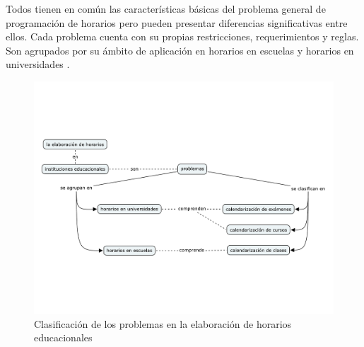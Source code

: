 \documentclass[draft,12pt,headsepline,footsepline,paper=letter]{scrreprt}
\begin{document}
Todos tienen en común las características básicas del problema general de programación de horarios pero pueden presentar diferencias significativas entre ellos. Cada problema cuenta con su propias restricciones, requerimientos y reglas. Son agrupados por su ámbito de aplicación en horarios en escuelas y horarios en universidades \citep[p.~10]{abdullah06heuristic-approaches}.

\begin{figure}[hbtp]
\centering
\includegraphics[width=\textwidth]{timetabling_classification.pdf}
\caption[Clasificación del problema]{Clasificación de los problemas en la elaboración de horarios educacionales}
\label{fig:timetabling_classification}
\end{figure}

\end{document}
